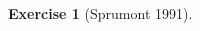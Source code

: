 \documentclass[letter, 10pt]{article}
\theoremstyle{definition}
\newtheorem{exercise}{Exercise}[section]
\begin{document}
\begin{spacing}{1.1}
\begin{exercise}[Sprumont 1991]
\begin{enumerate}
  \end{enumerate}

\end{exercise}


\end{spacing}
\end{document}
